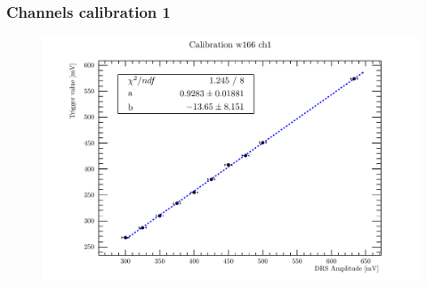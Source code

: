 
\begin{frame} [fragile]
\small
	\frametitle{Channels calibration 1}
    		\begin{figure}
		 \centering
			\includegraphics[scale=0.5]{figures/ch1.pdf}
		\end{figure}  
\end{frame}
